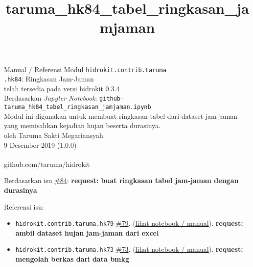 \documentclass[11pt]{article}
\title{taruma\_hk84\_tabel\_ringkasan\_jamjaman}
\providecommand{\tightlist}{%
      \setlength{\itemsep}{0pt}\setlength{\parskip}{0pt}}
\begin{document}
  
	\begin{titlepage}
		\vspace*{\fill}
		\begin{center}
 		\normalsize Manual / Referensi Modul \texttt{hidrokit.contrib.taruma}\\
		\huge \texttt{.hk84}: Ringkasan Jam-Jaman\\ 
		\small telah tersedia pada versi hidrokit 0.3.4 \\[0.2cm]
      	\small Berdasarkan \emph{Jupyter Notebook}: \texttt{github-taruma\_hk84\_tabel\_ringkasan\_jamjaman.ipynb} \\[0.5cm]
      	\small Modul ini digunakan untuk membuat ringkasan tabel dari dataset jam-jaman yang memisahkan kejadian hujan beserta durasinya. \\[0.5cm]
		\normalsize oleh Taruma Sakti Megariansyah\\[0.5cm]
      	\normalsize 9 Desember 2019 (1.0.0)\\[1cm]
    	\\
      	\normalsize github.com/taruma/hidrokit
		\end{center}
    	\vspace*{\fill}
	\end{titlepage}
    
    

    
    

    Berdasarkan isu
\href{https://github.com/taruma/hidrokit/issues/84}{\#84}:
\textbf{request: buat ringkasan tabel jam-jaman dengan durasinya}

Referensi isu:

\begin{itemize}
\tightlist
\item
  \texttt{hidrokit.contrib.taruma.hk79}
  \href{https://github.com/taruma/hidrokit/issues/79}{\#79}.
  (\href{https://nbviewer.jupyter.org/gist/taruma/05dab67fac8313a94134ac02d0398897}{lihat
  notebook / manual}). \textbf{request: ambil dataset hujan jam-jaman
  dari excel}
\item
  \texttt{hidrokit.contrib.taruma.hk73}
  \href{https://github.com/taruma/hidrokit/issues/73}{\#73}.
  (\href{https://nbviewer.jupyter.org/gist/taruma/b00880905f297013f046dad95dc2e284}{lihat
  notebook / manual}). \textbf{request: mengolah berkas dari data bmkg}
\end{itemize}
\end{document}
